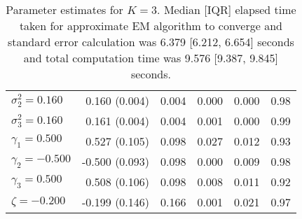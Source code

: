 \begin{table}[ht]
\begin{tabular}{l|rrrrr}
  $\sigma^2_2 = 0.160$ &  0.160 (0.004) & 0.004 &  0.000 & 0.000 & 0.98 \\ 
  $\sigma^2_3 = 0.160$ &  0.161 (0.004) & 0.004 &  0.001 & 0.000 & 0.99 \\ 
  $\gamma_1 = 0.500$ &  0.527 (0.105) & 0.098 &  0.027 & 0.012 & 0.93 \\ 
  $\gamma_2 = -0.500$ & -0.500 (0.093) & 0.098 &  0.000 & 0.009 & 0.98 \\ 
  $\gamma_3 = 0.500$ &  0.508 (0.106) & 0.098 &  0.008 & 0.011 & 0.92 \\ 
  $\zeta = -0.200$ & -0.199 (0.146) & 0.166 &  0.001 & 0.021 & 0.97 \\ 
   \hline
\end{tabular}
\endgroup
\caption{Parameter estimates for $K=3$. Median [IQR] elapsed time taken for approximate EM algorithm to converge and standard error calculation was 6.379 [6.212, 6.654] seconds and total computation time was 9.576 [9.387, 9.845] seconds.} 
\end{table}

